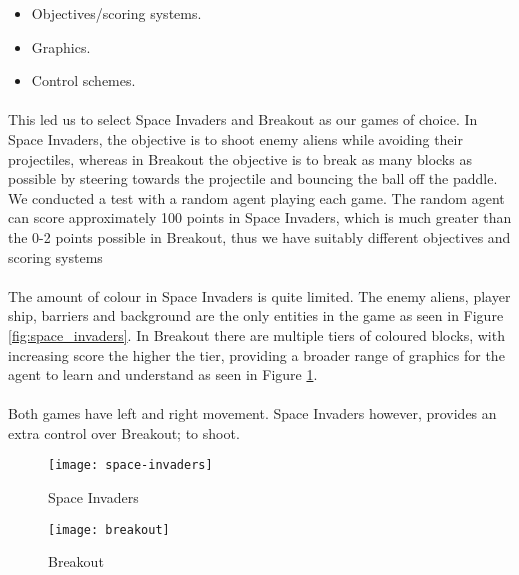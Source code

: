 \begin{itemize}
	\item Objectives/scoring systems.
	\item Graphics.
	\item Control schemes.
\end{itemize} \paragraph{}

This led us to select Space Invaders \cite{space-invaders} and Breakout \cite{breakout} as our games of choice. In Space Invaders, the objective is to shoot enemy aliens while avoiding their projectiles, whereas in Breakout the objective is to break as many blocks as possible by steering towards the projectile and bouncing the ball off the paddle. We conducted a test with a random agent playing each game. The random agent can score approximately 100 points in Space Invaders, which is much greater than the 0-2 points possible in Breakout, thus we have suitably different objectives and scoring systems \paragraph{}

The amount of colour in Space Invaders is quite limited. The enemy aliens, player ship, barriers and background are the only entities in the game as seen in Figure \ref{fig:space_invaders}. In Breakout there are multiple tiers of coloured blocks, with increasing score the higher the tier, providing a broader range of graphics for the agent to learn and understand as seen in Figure \ref{fig:breakout}. \paragraph{}

Both games have left and right movement. Space Invaders however, provides an extra control over Breakout; to shoot.

\begin{figure}[h]
	\begin{minipage}[c]{0.4\textwidth}
		\texttt{[image: space-invaders]}
		\caption{Space Invaders}
		\label{fig:space_invaders}
	\end{minipage}
	\hfill
	\begin{minipage}[c]{0.4\textwidth}
		\texttt{[image: breakout]}
		\caption{Breakout}
		\label{fig:breakout}
	\end{minipage}
\end{figure}

